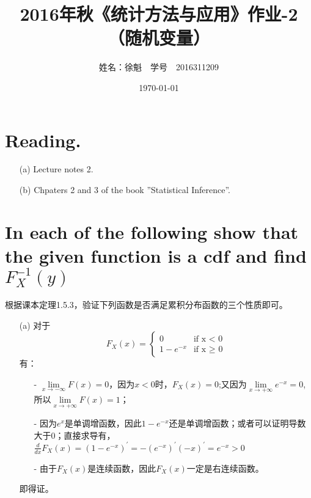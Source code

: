 \documentclass [12pt]{article}
\begin{document}
 \begin{CJK*}{GBK}{kai}
\newtheorem{theorem}{定理}
\newtheorem{definition}{定义}
\newtheorem{lemma}{引理}
\newtheorem{corollary}{推论}
\newtheorem{proposition}{性质}
\newtheorem{example}{例}
\newtheorem{remark}{注}
    \title{2016年秋《统计方法与应用》作业-2（随机变量）}
    \author{ 姓名：徐魁\,\,\,\, 学号~~{2016311209}}
    \date{\today}
\maketitle

\section{Reading. }
\begin{enumerate}
  \item[(a)] Lecture notes 2.
 \item[(b)] Chpaters 2 and 3 of the book ”Statistical Inference”.\\
 
\end{enumerate}

\section{In each of the following show that the given function is a cdf and find $F_{X}^{-1}{(y)}$}
根据课本定理1.5.3，验证下列函数是否满足累积分布函数的三个性质即可。
\begin{enumerate}
  \item[(a)]  对于
$$F_{X}(x)=
\begin{cases}
0& \text{if x < 0}\\
1- e^{-x} & \text{if x $\ge$ 0}
\end{cases}$$
有：
\begin{itemize}
\item[-] $\lim\limits_{x \to -\infty }F(x) = 0$，因为$x<0$时，$F_{X}(x)=0$;又因为$\lim\limits_{x \to +\infty }e^{-x} = 0$, 所以$\lim\limits_{x \to +\infty }F(x) = 1$；
\item[-] 因为$e^x$是单调增函数，因此$1 - e^{-x}$还是单调增函数；或者可以证明导数大于0；直接求导有，$\frac{d}{dx}F_{X}(x)=(1-e^{-x})^{'}=-(e^{-x})^{'}(-x)^{'}=e^{-x} >0$
\item[-] 由于$F_{X}(x)$是连续函数，因此$F_{X}(x)$一定是右连续函数。
\end{itemize}
即得证。\\


\end{enumerate}
\end{CJK*}
\end{document}
